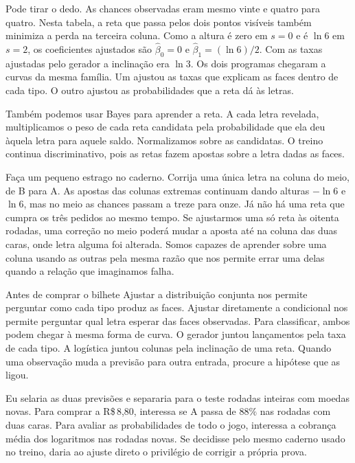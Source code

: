 Pode tirar o dedo. As chances observadas eram mesmo vinte e quatro para quatro. Nesta tabela, a reta que passa pelos dois pontos visíveis também minimiza a perda na terceira coluna. Como a altura é zero em $s=0$ e é $\ln 6$ em $s=2$, os coeficientes ajustados são $\widehat\beta_0=0$ e $\widehat\beta_1=(\ln 6)/2$. Com as taxas ajustadas pelo gerador a inclinação era $\ln 3$. Os dois programas chegaram a curvas da mesma família. Um ajustou as taxas que explicam as faces dentro de cada tipo. O outro ajustou as probabilidades que a reta dá às letras.

Também podemos usar Bayes para aprender a reta. A cada letra revelada, multiplicamos o peso de cada reta candidata pela probabilidade que ela deu àquela letra para aquele saldo. Normalizamos sobre as candidatas. O treino continua discriminativo, pois as retas fazem apostas sobre a letra dadas as faces.

Faça um pequeno estrago no caderno. Corrija uma única letra na coluna do meio, de B para A. As apostas das colunas extremas continuam dando alturas $-\ln 6$ e $\ln 6$, mas no meio as chances passam a treze para onze. Já não há uma reta que cumpra os três pedidos ao mesmo tempo. Se ajustarmos uma só reta às oitenta rodadas, uma correção no meio poderá mudar a aposta até na coluna das duas caras, onde letra alguma foi alterada. Somos capazes de aprender sobre uma coluna usando as outras pela mesma razão que nos permite errar uma delas quando a relação que imaginamos falha.

\begin{quadro}{Antes de comprar o bilhete}
 Ajustar a distribuição conjunta nos permite perguntar como cada tipo produz as faces. Ajustar diretamente a condicional nos permite perguntar qual letra esperar das faces observadas. Para classificar, ambos podem chegar à mesma forma de curva.
 O gerador juntou lançamentos pela taxa de cada tipo. A logística juntou colunas pela inclinação de uma reta. Quando uma observação muda a previsão para outra entrada, procure a hipótese que as ligou.
\end{quadro}

Eu selaria as duas previsões e separaria para o teste rodadas inteiras com moedas novas. Para comprar a R\$\,8,80, interessa se A passa de $88\%$ nas rodadas com duas caras. Para avaliar as probabilidades de todo o jogo, interessa a cobrança média dos logaritmos nas rodadas novas. Se decidisse pelo mesmo caderno usado no treino, daria ao ajuste direto o privilégio de corrigir a própria prova.

